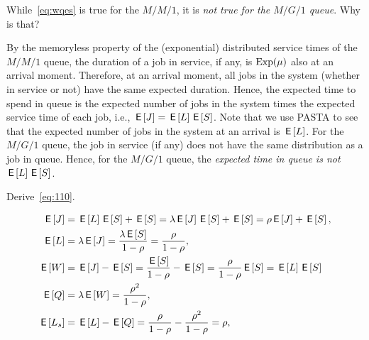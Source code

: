 \begin{exercise}\label{ex:l-216}
While~\cref{eq:wqes} is true for the $M/M/1$, it is \emph{not true for the $M/G/1$ queue}. Why is that?
\begin{solution}
 By the memoryless property of the (exponential) distributed service times of the $M/M/1$ queue, the duration of a job in service, if any, is $\mathrm{Exp}(\mu)$ also at an arrival moment.
 Therefore, at an arrival moment, all jobs in the system (whether in service or not) have the same expected duration.
 Hence, the expected time to spend in queue is the expected number of jobs in the system times the expected service time of each job, i.e., $\,\mathsf{E}\left[J\right] = \,\mathsf{E}\left[L\right] \,\mathsf{E}\left[S\right]$.
 Note that we use PASTA to see that the expected number of jobs in the system at an arrival is $\,\mathsf{E}\left[L\right]$.
 For the $M/G/1$ queue, the job in service (if any) does not have the same distribution as a job in queue.
 Hence, for the $M/G/1$ queue, the \emph{expected time in queue is not} $\,\mathsf{E}\left[L\right] \,\mathsf{E}\left[S\right]$.
\end{solution}
\end{exercise}

\begin{exercise}\label{ex:l-215}
Derive~\cref{eq:110}.
\begin{solution}
\begin{align*}
 \,\mathsf{E}\left[J\right] &= \,\mathsf{E}\left[L\right] \,\mathsf{E}\left[S\right] + \,\mathsf{E}\left[S\right] = \lambda \,\mathsf{E}\left[J\right] \,\mathsf{E}\left[S\right] + \,\mathsf{E}\left[S\right]= \rho \,\mathsf{E}\left[J\right] + \,\mathsf{E}\left[S\right], \\
 \,\mathsf{E}\left[L\right] &= \lambda \,\mathsf{E}\left[J\right] = \frac{\lambda \,\mathsf{E}\left[S\right]}{1-\rho} = \frac\rho{1-\rho}, \\
 \,\mathsf{E}\left[W\right] &= \,\mathsf{E}\left[J\right] - \,\mathsf{E}\left[S\right] = \frac{\,\mathsf{E}\left[S\right]}{1-\rho} - \,\mathsf{E}\left[S\right] = \frac{\rho}{1-\rho} \,\mathsf{E}\left[S\right] = \,\mathsf{E}\left[L\right] \,\mathsf{E}\left[S\right]\\\
 \,\mathsf{E}\left[Q\right] &= \lambda \,\mathsf{E}\left[W\right] = \frac{\rho^2}{1-\rho}, \\
 \,\mathsf{E}\left[L_s\right] &= \,\mathsf{E}\left[L\right] - \,\mathsf{E}\left[Q\right] = \frac{\rho}{1-\rho} - \frac{\rho^2}{1-\rho} = \rho,
\end{align*}
\end{solution}
\end{exercise}



